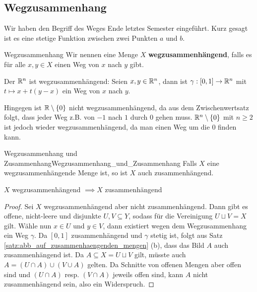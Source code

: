 \subsection{Wegzusammenhang}
Wir haben den Begriff des Weges Ende letztes Semester eingeführt. Kurz gesagt ist es eine stetige Funktion zwischen zwei Punkten $a$ und $b$.

\begin{definition}{Wegzusammenhang}{}
Wir nennen eine Menge $X$ \textbf{wegzusammenhängend}, falls es für alle $x,y \in X$ einen Weg von $x$ nach $y$ gibt.
\end{definition}
\begin{example}
Der $\mathbb{R}^n$ ist wegzusammenhängend: Seien $x,y \in \mathbb{R}^n$, dann ist $\gamma: [0,1] \to \mathbb{R}^n$ mit $t\mapsto x + t(y-x)$ ein Weg von $x$ nach $y$.

Hingegen ist $\mathbb{R}\setminus \{0\}$ nicht wegzusammenhängend, da aus dem Zwischenwertsatz folgt, dass jeder Weg z.B. von $-1$ nach $1$ durch $0$ gehen muss. $\mathbb{R}^n \setminus \{0\}$ mit $n\geq 2$ ist jedoch wieder wegzusammenhängend, da man einen Weg um die $0$ finden kann.
\end{example}

\begin{satz}{Wegzusammenhang und Zusammenhang}{Wegzusammenhang_und_Zusammenhang}
Falls $X$ eine wegzusammenhängende Menge ist, so ist $X$ auch zusammenhängend.

\centering $X$ wegzusammenhängend $\implies X$ zusammenhängend
\end{satz}
\begin{proof}
Sei $X$ wegzusammenhängend aber nicht zusammenhängend. Dann gibt es offene, nicht-leere und disjunkte $U, V \subseteq Y$, sodass für die Vereinigung $U \sqcup V = X$ gilt. Wähle nun $x \in U$ und $y \in V$, dann existiert wegen dem Wegzusammenhang ein Weg $\gamma$. Da $[0,1]$ zusammenhängend und $\gamma$ stetig ist, folgt aus Satz \ref{satz:abb_auf_zusammenhaengenden_mengen} (b), dass das Bild $A$ auch zusammenhängend ist. Da $A \subseteq X = U \sqcup V$ gilt, müsste auch $A = (U \cap A) \cup (V \cup A)$ gelten. Da Schnitte von offenen Mengen aber offen sind und $(U \cap A)$ resp. $(V \cap A)$ jeweils offen sind, kann $A$ nicht zusammenhängend sein, also ein Widerspruch.
\end{proof}

